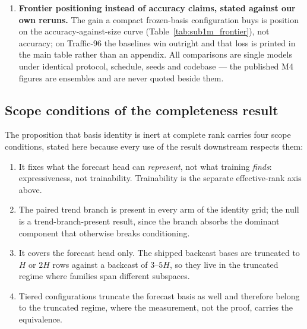 \begin{enumerate}
  recovers converged scores to within 0.11 sMAPE. Rectifying the output
  removes the mode by construction on non-negative targets (collapses 107 of
  23,786 runs to 0 of 136), and pairing a trend branch repairs the
  conditioning failure a low-effective-rank basis causes (DCT and
  Karhunen--Lo\`eve arms from 0 of 10 seeds to 10 of 10, $p = 0.00018$),
  though rectification destroys cancellation on sub-band designs.
\item \textbf{Frontier positioning instead of accuracy claims, stated
  against our own reruns.} The gain a compact frozen-basis configuration
  buys is position on the accuracy-against-size curve
  (Table~\ref{tab:sub1m_frontier}), not accuracy; on Traffic-96 the
  baselines win outright and that loss is printed in the main table rather
  than an appendix. All comparisons are single models under identical
  protocol, schedule, seeds and codebase --- the published M4 figures are
  ensembles and are never quoted beside them.
\end{enumerate}

\subsection{Scope conditions of the completeness result}

The proposition that basis identity is inert at complete rank carries four
scope conditions, stated here because every use of the result downstream
respects them:

\begin{enumerate}
\item It fixes what the forecast head can \emph{represent}, not what
  training \emph{finds}: expressiveness, not trainability. Trainability is
  the separate effective-rank axis above.
\item The paired trend branch is present in every arm of the identity grid;
  the null is a trend-branch-present result, since the branch absorbs the
  dominant component that otherwise breaks conditioning.
\item It covers the forecast head only. The shipped backcast bases are
  truncated to $H$ or $2H$ rows against a backcast of $3$--$5H$, so they
  live in the truncated regime where families span different subspaces.
\item Tiered configurations truncate the forecast basis as well and
  therefore belong to the truncated regime, where the measurement, not the
  proof, carries the equivalence.
\end{enumerate}

